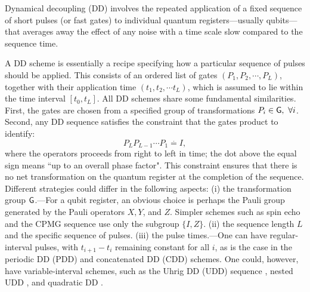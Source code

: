 \documentclass[pra,reprint,superscriptaddress]{revtex4-2}
\begin{document}
Dynamical decoupling (DD) involves the repeated application of a fixed sequence of short pulses (or fast gates) to individual quantum registers---usually qubits---that averages away the effect of any noise with a time scale slow compared to the sequence time. 


A DD scheme is essentially a recipe specifying how a particular sequence of pulses should be applied. This consists of an ordered list of gates  
$(P_1, P_2, \cdots, P_L)$, together with their application time $(t_1, t_2,\cdots t_L)$, which is assumed to lie within the time interval $[t_0, t_L]$. 
All DD schemes share some fundamental similarities. 
First, the gates are chosen from a specified group of transformations $P_i \in \mathsf{G},\ \forall i$.
Second, any DD sequence satisfies the constraint that the gates product to identify:
\begin{equation}\label{eq:fundamental-constraint}
    P_L P_{L-1} \cdots P_1 \stackrel{\textbf{.}}{=} I,
\end{equation}
where the operators proceeds from right to left in time; the dot above the equal sign means ``up to an overall phase factor". This constraint ensures that there is no net transformation on the quantum register at the completion of the sequence. 
Different strategies could differ in the following aspects:
(i) the transformation group $\mathsf{G}$.---For a qubit register, an obvious choice is perhaps the Pauli group generated by the Pauli operators $X,Y$, and $Z$. Simpler schemes such as spin echo \cite{Hahn1950} and the CPMG sequence \cite{Carr1954,Meiboom1958} use only the subgroup $\{I,Z\}$.  
(ii) the sequence length $L$ and the specific sequence of pulses.
(iii) the pulse times.---One can have regular-interval pulses, with $t_{i+1}-t_{i}$ remaining constant  for all $i$, as is the case in the periodic DD (PDD) \cite{viola1999dynamical} and concatenated DD (CDD) \cite{khodjasteh2005fault} schemes. One could, however, have variable-interval schemes, such as the Uhrig DD (UDD) sequence \cite{uhrig2007keeping}, nested UDD \cite{wang2011protection}, and quadratic DD \cite{kuo2011quadratic}.
\end{document}
